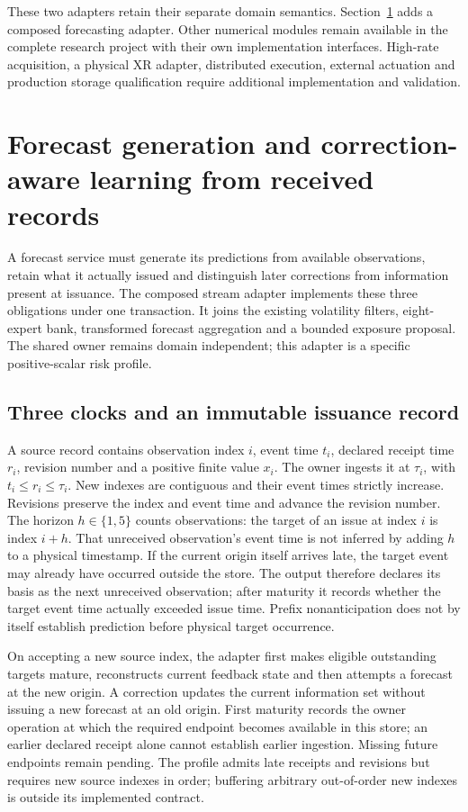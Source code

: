 \documentclass[11pt,a4paper]{article}
\theoremstyle{definition}\newtheorem{definition}[theorem]{Definition}
\begin{document}
These two adapters retain their separate domain semantics. Section~\ref{sec:stream} adds a composed forecasting adapter. Other numerical modules remain available in the complete research project with their own implementation interfaces. High-rate acquisition, a physical XR adapter, distributed execution, external actuation and production storage qualification require additional implementation and validation.

\section{Forecast generation and correction-aware learning from received records}\label{sec:stream}
A forecast service must generate its predictions from available observations, retain what it actually issued and distinguish later corrections from information present at issuance. The composed stream adapter implements these three obligations under one transaction. It joins the existing volatility filters, eight-expert bank, transformed forecast aggregation and a bounded exposure proposal. The shared owner remains domain independent; this adapter is a specific positive-scalar risk profile.

\subsection{Three clocks and an immutable issuance record}
A source record contains observation index $i$, event time $t_i$, declared receipt time $r_i$, revision number and a positive finite value $x_i$. The owner ingests it at $\tau_i$, with $t_i\leq r_i\leq\tau_i$. New indexes are contiguous and their event times strictly increase. Revisions preserve the index and event time and advance the revision number. The horizon $h\in\{1,5\}$ counts observations: the target of an issue at index $i$ is index $i+h$. That unreceived observation's event time is not inferred by adding $h$ to a physical timestamp. If the current origin itself arrives late, the target event may already have occurred outside the store. The output therefore declares its basis as the next unreceived observation; after maturity it records whether the target event time actually exceeded issue time. Prefix nonanticipation does not by itself establish prediction before physical target occurrence.

On accepting a new source index, the adapter first makes eligible outstanding targets mature, reconstructs current feedback state and then attempts a forecast at the new origin. A correction updates the current information set without issuing a new forecast at an old origin. First maturity records the owner operation at which the required endpoint becomes available in this store; an earlier declared receipt alone cannot establish earlier ingestion. Missing future endpoints remain pending. The profile admits late receipts and revisions but requires new source indexes in order; buffering arbitrary out-of-order new indexes is outside its implemented contract.
\end{document}
